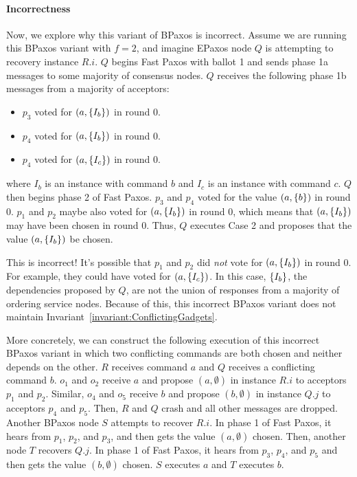 \documentclass{mwhittaker}
\theoremstyle{definition}
\newcommand{\invref}[1]{Invariant~\ref{invariant:#1}}
\begin{document}
\paragraph{Incorrectness}
Now, we explore why this variant of BPaxos is incorrect. Assume we are running
this BPaxos variant with $f = 2$, and imagine EPaxos node $Q$ is attempting to
recovery instance $R.i$. $Q$ begins Fast Paxos with ballot 1 and sends phase 1a
messages to some majority of consensus nodes. $Q$ receives the following phase
1b messages from a majority of acceptors:
\begin{itemize}
  \item
    $p_3$ voted for $(a, \{I_b\})$ in round $0$.
  \item
    $p_4$ voted for $(a, \{I_b\})$ in round $0$.
  \item
    $p_4$ voted for $(a, \{I_c\})$ in round $0$.
\end{itemize}
where $I_b$ is an instance with command $b$ and $I_c$ is an instance with
command $c$.
%
$Q$ then begins phase 2 of Fast Paxos. $p_3$ and $p_4$ voted for the value $(a,
\{b\})$ in round $0$. $p_1$ and $p_2$ maybe also voted for $(a, \{I_b\})$
in round $0$, which means that $(a, \{I_b\})$ may have been chosen in round
$0$. Thus, $Q$ executes Case 2 and proposes that the value $(a, \{I_b\})$ be
chosen.

This is incorrect! It's possible that $p_1$ and $p_2$ did \emph{not} vote for
$(a, \{I_b\})$ in round $0$. For example, they could have voted for $(a,
\{I_c\})$. In this case, $\{I_b\}$, the dependencies proposed by $Q$, are
not the union of responses from a majority of ordering service nodes. Because
of this, this incorrect BPaxos variant does not maintain
\invref{ConflictingGadgets}.

More concretely, we can construct the following execution of this incorrect
BPaxos variant in which two conflicting commands are both chosen and neither
depends on the other. $R$ receives command $a$ and $Q$ receives a conflicting
command $b$.  $o_1$ and $o_2$ receive $a$ and propose $(a, \emptyset)$ in
instance $R.i$ to acceptors $p_1$ and $p_2$. Similar, $o_4$ and $o_5$ receive
$b$ and propose $(b, \emptyset)$ in instance $Q.j$ to acceptors $p_4$ and
$p_5$. Then, $R$ and $Q$ crash and all other messages are dropped. Another
BPaxos node $S$ attempts to recover $R.i$. In phase 1 of Fast Paxos, it hears
from $p_1$, $p_2$, and $p_3$, and then gets the value $(a, \emptyset)$ chosen.
Then, another node $T$ recovers $Q.j$. In phase 1 of Fast Paxos, it hears from
$p_3$, $p_4$, and $p_5$ and then gets the value $(b, \emptyset)$ chosen. $S$
executes $a$ and $T$ executes $b$.
\end{document}
